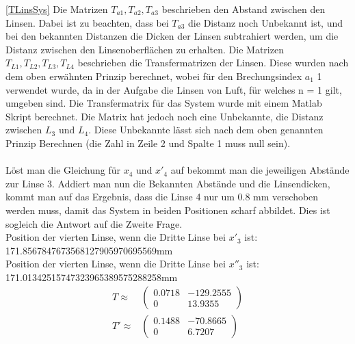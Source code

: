 \documentclass[11pt,twoside,a4paper]{article}
\begin{document}
	\ref{TLinsSys} Die Matrizen \(T_{a1},T_{a2},T_{a3}\) beschrieben den Abstand zwischen den Linsen. Dabei ist zu beachten, dass bei \(T_{a3}\) die Distanz noch Unbekannt ist, und bei den bekannten Distanzen die Dicken der Linsen subtrahiert werden, um die Distanz zwischen den Linsenoberflächen zu erhalten. Die Matrizen \(T_{L1},T_{L2},T_{L3},T_{L4}\) beschrieben die Transfermatrizen der Linsen. Diese wurden nach dem oben erwähnten Prinzip berechnet, wobei für den Brechungsindex \(a_{1}\) 1 verwendet wurde, da in der Aufgabe die Linsen von Luft, für welches n = 1 gilt, umgeben sind.
	Die Transfermatrix für das System wurde mit einem Matlab Skript berechnet. Die Matrix hat jedoch noch eine Unbekannte, die Distanz zwischen \(L_{3}\) und \(L_{4}\). Diese Unbekannte lässt sich nach dem oben genannten Prinzip Berechnen (die Zahl in Zeile 2 und Spalte 1 muss null sein). \\
	\\
	Löst man die Gleichung für \(x_{4}\) und \(x'_{4}\) auf bekommt man die jeweiligen Abstände zur Linse 3. Addiert man nun die Bekannten Abstände und die Linsendicken, kommt man auf das Ergebnis, dass die Linse 4 nur um 0.8 mm verschoben werden muss, damit das System in beiden Positionen scharf abbildet. Dies ist sogleich die Antwort auf die Zweite Frage. \\
	Position der vierten Linse, wenn die Dritte Linse bei \(x'_{3}\) ist: 171.8567847673568127905970695569mm \\
	Position der vierten Linse, wenn die Dritte Linse bei \(x''_{3}\) ist: 171.01342515747323965389575288258mm \\
	\begin{equation*}
	\begin{aligned}
	T \approx
	&
	\begin{pmatrix}
	0.0718 & -129.2555\\
	0 & 13.9355
	\end{pmatrix}\\
	T' \approx
	&
	\begin{pmatrix}
	0.1488 & -70.8665\\
	0 & 6.7207
	\end{pmatrix}
	\end{aligned}
	\end{equation*}
\end{document}
